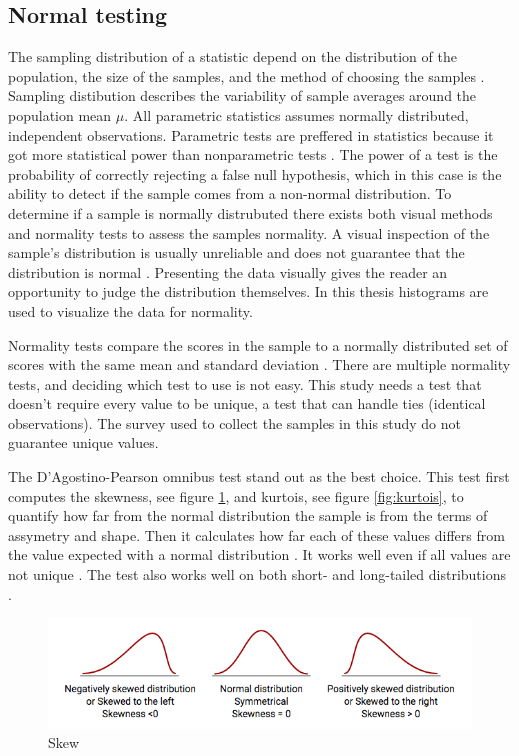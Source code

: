 \subsection{Normal testing}\label{sec:normaltesting}
The sampling distribution of a statistic depend on the distribution of the population, the size of the samples, and the method of choosing the samples \citep{Walpole2012}. Sampling distibution describes the variability of sample averages around the population mean $\mu$. All parametric statistics assumes normally distributed, independent observations. Parametric tests are preffered in statistics because it got more statistical power than nonparametric tests \citep{Frost2015}. The power of a test is the probability of correctly rejecting a false null hypothesis, which in this case is the ability to detect if the sample comes from a non-normal distribution. To determine if a sample is normally distrubuted there exists both visual methods and normality tests to assess the samples normality. A visual inspection of the sample's distribution is usually unreliable and does not guarantee that the distribution is normal \citep{Pearson2006}. Presenting the data visually gives the reader an opportunity to judge the distribution themselves. In this thesis histograms are used to visualize the data for normality. 

Normality tests compare the scores in the sample to a normally distributed set of scores with the same mean and standard deviation \citep{Ghasemi2012}. There are multiple normality tests, and deciding which test to use is not easy. This study needs a test that doesn't require every value to be unique, a test that can handle ties (identical observations). The survey used to collect the samples in this study do not guarantee unique values. 

The D'Agostino-Pearson omnibus test stand out as the best choice. This test first computes the skewness, see figure \ref{fig:skew}, and kurtois, see figure \ref{fig:kurtois}, to quantify how far from the normal distribution the sample is from the terms of assymetry and shape. Then it calculates how far each of these values differs from the value expected with a normal distribution \citep{Pearson2006}. It works well even if all values are not unique \citep{Motulsky2013}. The test also works well on both short- and long-tailed distributions \citep{Yap2011}. \newline  %

\begin{figure}[h!]
	\centering
	\includegraphics[width=0.7\linewidth]{"fig/skew"}
	\caption{Skew \citep{MedCalcSoftwarebvba2017}}
	\label{fig:skew}
\end{figure}

